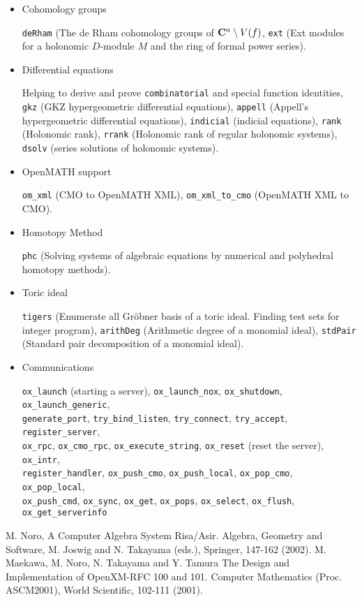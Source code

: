 \documentclass[12pt]{article}
\begin{document}
\begin{itemize}
\item Cohomology groups

{\tt deRham} (The de Rham cohomology groups of
${\bf C}^n \setminus V(f)$,
{\tt ext} (Ext modules for a holonomic $D$-module $M$
and the ring of formal power series).

\item Differential equations

Helping to derive and prove {\tt combinatorial} and
{special function identities},
{\tt gkz} (GKZ hypergeometric differential equations),
{\tt appell} (Appell's hypergeometric differential equations),
{\tt indicial} (indicial equations),
{\tt rank} (Holonomic rank),
{\tt rrank} (Holonomic rank of regular holonomic systems),
{\tt dsolv} (series solutions of holonomic systems).

\item OpenMATH support

{\tt om\_xml} (CMO to OpenMATH XML),
{\tt om\_xml\_to\_cmo} (OpenMATH XML to CMO).

\item Homotopy Method

{\tt phc} (Solving systems of algebraic equations by
numerical and polyhedral homotopy methods).

\item Toric ideal

{\tt tigers} (Enumerate all Gr\"obner basis of a toric ideal.
Finding test sets for integer program),
{\tt arithDeg} (Arithmetic degree of a monomial ideal),
{\tt stdPair} (Standard pair decomposition of a monomial ideal).

\item Communications

{\tt ox\_launch} (starting a server),
{\tt ox\_launch\_nox},
{\tt ox\_shutdown},
{\tt ox\_launch\_generic},\\
{\tt generate\_port},
{\tt try\_bind\_listen},
{\tt try\_connect},
{\tt try\_accept},
{\tt register\_server},\\
{\tt ox\_rpc},
{\tt ox\_cmo\_rpc},
{\tt ox\_execute\_string},
{\tt ox\_reset} (reset the server),
{\tt ox\_intr},\\
{\tt register\_handler},
{\tt ox\_push\_cmo},
{\tt ox\_push\_local},
{\tt ox\_pop\_cmo},
{\tt ox\_pop\_local},\\
{\tt ox\_push\_cmd},
{\tt ox\_sync},
{\tt ox\_get},
{\tt ox\_pops},
{\tt ox\_select},
{\tt ox\_flush},
{\tt ox\_get\_serverinfo}

\end{itemize}

\begin{thebibliography}{99}
M. Noro,  A Computer Algebra System Risa/Asir.  Algebra, Geometry and Software, M. Joswig and N. Takayama (eds.), Springer, 147-162 (2002).
M. Maekawa, M. Noro, N. Takayama and Y. Tamura
The Design and Implementation of OpenXM-RFC 100 and 101.
Computer Mathematics (Proc. ASCM2001), World Scientific, 102-111 (2001).
\end{thebibliography}
\end{document}
